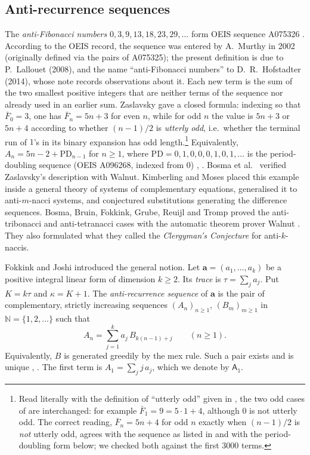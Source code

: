 \documentclass[11pt]{amsart}
\theoremstyle{definition}
\theoremstyle{remark}
\newcommand{\N}{\mathbb{N}}
\begin{document}
\subsection{Anti-recurrence sequences}
The \emph{anti-Fibonacci numbers} $0,3,9,13,18,23,29,\dots$ form OEIS sequence A075326 \cite{A075326}. According to the OEIS record, the sequence was entered by A.~Murthy in 2002 (originally defined via the pairs of A075325); the present definition is due to P.~Lallouet (2008), and the name ``anti-Fibonacci numbers'' to D.~R.~Hofstadter (2014), whose note \cite{Hof} records observations about it. Each new term is the sum of the two smallest positive integers that are neither terms of the sequence nor already used in an earlier sum. Zaslavsky \cite[Thm.~1]{Zas} gave a closed formula: indexing so that $\bar F_0=3$, one has $\bar F_n=5n+3$ for even $n$, while for odd $n$ the value is $5n+3$ or $5n+4$ according to whether $(n-1)/2$ is \emph{utterly odd}, i.e.\ whether the terminal run of $1$'s in its binary expansion has odd length.\footnote{Read literally with the definition of ``utterly odd'' given in \cite{Zas}, the two odd cases of \cite[Thm.~1]{Zas} are interchanged: for example $\bar F_1=9=5\cdot1+4$, although $0$ is not utterly odd. The correct reading, $\bar F_n=5n+4$ for odd $n$ exactly when $(n-1)/2$ is \emph{not} utterly odd, agrees with the sequence as listed in \cite{Zas} and with the period-doubling form below; we checked both against the first $3000$ terms.} Equivalently, $A_n=5n-2+\mathrm{PD}_{n-1}$ for $n\ge1$, where $\mathrm{PD}=0,1,0,0,0,1,0,1,\dots$ is the period-doubling sequence (OEIS A096268, indexed from $0$) \cite[eq.~(2)]{FJarxiv}, \cite[\S1]{FJ}. Bosma et al.\ \cite[\S3]{Bosma} verified Zaslavsky's description with Walnut. Kimberling and Moses \cite{KM} placed this example inside a general theory of systems of complementary equations, generalised it to anti-$m$-nacci systems, and conjectured substitutions generating the difference sequences. Bosma, Bruin, Fokkink, Grube, Reuijl and Tromp \cite{Bosma} proved the anti-tribonacci and anti-tetranacci cases with the automatic theorem prover Walnut \cite{Mousavi}. They also formulated what they called the \emph{Clergyman's Conjecture} for anti-$k$-naccis.

Fokkink and Joshi \cite{FJarxiv,FJ} introduced the general notion. Let $\mathbf a=(a_1,\dots,a_k)$ be a positive integral linear form of dimension $k\ge2$. Its \emph{trace} is $\tau=\sum_j a_j$. Put $K=k\tau$ and $\kappa=K+1$. The \emph{anti-recurrence sequence} of $\mathbf a$ is the pair of complementary, strictly increasing sequences $(A_n)_{n\ge1}$, $(B_m)_{m\ge1}$ in $\N=\{1,2,\dots\}$ such that
\begin{equation}\label{eq:def}
A_n=\sum_{j=1}^k a_j\,B_{k(n-1)+j}\qquad(n\ge1).
\end{equation}
Equivalently, $B$ is generated greedily by the mex rule. Such a pair exists and is unique \cite[Lemma~3]{FJarxiv}, \cite[Lemma~2]{FJ}. The first term is $A_1=\sum_j j\,a_j$, which we denote by $\mathsf A_1$.
\end{document}
